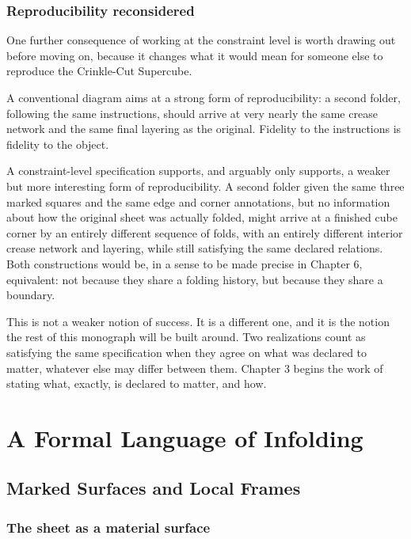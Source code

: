 \documentclass[11pt,oneside]{book}
\begin{document}
\hypertarget{reproducibility-reconsidered}{%
\section{Reproducibility
reconsidered}\label{reproducibility-reconsidered}}

One further consequence of working at the constraint level is worth
drawing out before moving on, because it changes what it would mean for
someone else to reproduce the Crinkle-Cut Supercube.

A conventional diagram aims at a strong form of reproducibility: a
second folder, following the same instructions, should arrive at very
nearly the same crease network and the same final layering as the
original. Fidelity to the instructions is fidelity to the object.

A constraint-level specification supports, and arguably only supports, a
weaker but more interesting form of reproducibility. A second folder
given the same three marked squares and the same edge and corner
annotations, but no information about how the original sheet was
actually folded, might arrive at a finished cube corner by an entirely
different sequence of folds, with an entirely different interior crease
network and layering, while still satisfying the same declared
relations. Both constructions would be, in a sense to be made precise in
Chapter 6, equivalent: not because they share a folding history, but
because they share a boundary.

This is not a weaker notion of success. It is a different one, and it is
the notion the rest of this monograph will be built around. Two
realizations count as satisfying the same specification when they agree
on what was declared to matter, whatever else may differ between them.
Chapter 3 begins the work of stating what, exactly, is declared to
matter, and how.

\part{A Formal Language of Infolding}

\hypertarget{chapter-3.-marked-surfaces-and-local-frames}{%
\chapter{Marked Surfaces and Local
Frames}\label{chapter-3.-marked-surfaces-and-local-frames}}

\hypertarget{the-sheet-as-a-material-surface}{%
\section{The sheet as a material
surface}\label{the-sheet-as-a-material-surface}}
\end{document}
